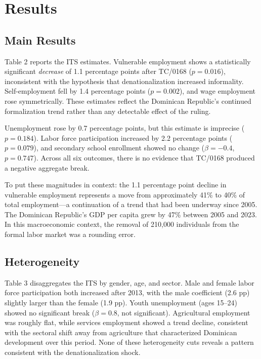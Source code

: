 \documentclass[12pt]{article}
\begin{document}
\section{Results}

\subsection{Main Results}



Table 2 reports the ITS estimates. Vulnerable employment shows a statistically significant \textit{decrease} of 1.1 percentage points after TC/0168 ($p = 0.016$), inconsistent with the hypothesis that denationalization increased informality. Self-employment fell by 1.4 percentage points ($p = 0.002$), and wage employment rose symmetrically. These estimates reflect the Dominican Republic's continued formalization trend rather than any detectable effect of the ruling.

Unemployment rose by 0.7 percentage points, but this estimate is imprecise ($p = 0.184$). Labor force participation increased by 2.2 percentage points ($p = 0.079$), and secondary school enrollment showed no change ($\beta = -0.4$, $p = 0.747$). Across all six outcomes, there is no evidence that TC/0168 produced a negative aggregate break.

To put these magnitudes in context: the 1.1 percentage point decline in vulnerable employment represents a move from approximately 41\% to 40\% of total employment---a continuation of a trend that had been underway since 2005. The Dominican Republic's GDP per capita grew by 47\% between 2005 and 2023. In this macroeconomic context, the removal of 210,000 individuals from the formal labor market was a rounding error.

\subsection{Heterogeneity}



Table 3 disaggregates the ITS by gender, age, and sector. Male and female labor force participation both increased after 2013, with the male coefficient (2.6 pp) slightly larger than the female (1.9 pp). Youth unemployment (ages 15--24) showed no significant break ($\beta = 0.8$, not significant). Agricultural employment was roughly flat, while services employment showed a trend decline, consistent with the sectoral shift away from agriculture that characterized Dominican development over this period. None of these heterogeneity cuts reveals a pattern consistent with the denationalization shock.
\end{document}
